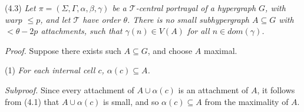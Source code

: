 \stmt
(4.3) \textit{Let $\pi = (\Sigma, \Gamma, \alpha, \beta, \gamma)$ be a $\mathscr{T}$-central portrayal of a hypergraph $G$, with warp $\le p$, and let $\mathscr{T}$ have order $\theta$. There is no small subhypergraph $A \subseteq G$ with $< \theta - 2p$ attachments, such that $\gamma(n) \in V(A)$ for all $n \in dom(\gamma)$.}

\textit{Proof.} Suppose there exists such $A \subseteq G$, and choose $A$ maximal.

\hspace*{12pt}(1) \textit{For each internal cell $c$, $\alpha(c) \subseteq A$.}

\textit{Subproof.} Since every attachment of $A \cup \alpha(c)$ is an attachment of $A$, it follows from (4.1) that $A \cup \alpha(c)$ is small, and so $\alpha(c) \subseteq A$ from the maximality of $A$.
